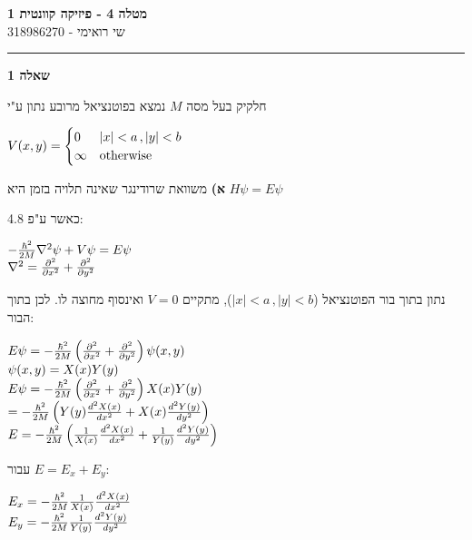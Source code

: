 \documentclass[14pt]{extarticle}
\makeatletter
\newenvironment{lefteqs}{%
    \begin{english}%
    \begin{flushleft}%
    \renewcommand{\arraystretch}{1.3}%
    $\begin{array}{@{}l@{}}%
}{%
    \end{array}$%
    \end{flushleft}%
    \end{english}%
}
\makeatother
\begin{document}
\begin{center}
    {\LARGE \textbf{מטלה 4 - פיזיקה קוונטית 1}}\\[0.5em]
    {\large שי רואימי - 318986270}\\[0.3em]
\end{center}

\hrule
\vspace{2em}

\textbf{\large שאלה 1}

חלקיק בעל מסה $M$ נמצא בפוטנציאל מרובע נתון ע"י
\begin{lefteqs}
    V(x,y) = \begin{cases}
        0 & |x|<a \, , |y|<b \\
        \infty & \text{otherwise}
    \end{cases}
\end{lefteqs}

\textbf{א)}
משוואת שרודינגר שאינה תלויה בזמן היא $H\psi = E\psi$

כאשר ע"פ 4.8:

\begin{lefteqs}
    -\frac{\hbar^2}{2M} \nabla^2 \psi + V\psi = E\psi \\
    \nabla^2 = \frac{\partial^2}{\partial x^2} + \frac{\partial^2}{\partial y^2}
\end{lefteqs}

נתון בתוך בור הפוטנציאל ($|x|<a \, , |y|<b$), מתקיים $V=0$ ואינסוף מחוצה לו.
לכן בתוך הבור:

\begin{lefteqs}
    E\psi = -\frac{\hbar^2}{2M} \left( \frac{\partial^2}{\partial x^2} + \frac{\partial^2 }{\partial y^2} \right) \psi(x,y) \\
    \psi(x,y) = X(x)Y(y) \\
    E\psi = -\frac{\hbar^2}{2M} \left( \frac{\partial^2}{\partial x^2} + \frac{\partial^2 }{\partial y^2}  \right) X(x) Y(y) \\
    = -\frac{\hbar^2}{2M} \left( Y(y) \frac{d^2 X(x)}{dx^2} + X(x) \frac{d^2 Y(y)}{dy^2} \right) \\
    E = -\frac{\hbar^2}{2M} \left( \frac{1}{X(x)} \frac{d^2 X(x)}{dx^2} + \frac{1}{Y(y)} \frac{d^2 Y(y)}{dy^2} \right)
\end{lefteqs}

עבור $E=E_x + E_y$:

\begin{lefteqs}
    E_x = -\frac{\hbar^2}{2M} \frac{1}{X(x)} \frac{d^2 X(x)}{dx^2} \\
    E_y = -\frac{\hbar^2}{2M} \frac{1}{Y(y)} \frac{d^2 Y(y)}{dy^2}
\end{lefteqs}
\end{document}
